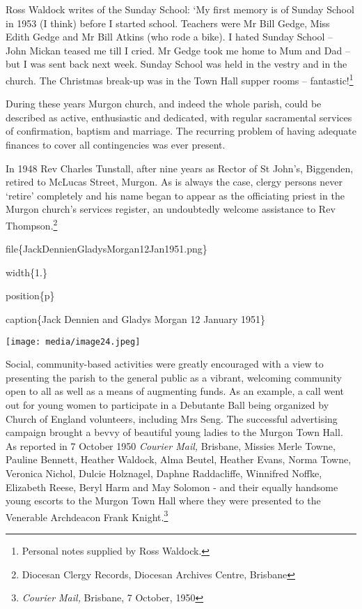 Ross Waldock writes of the Sunday School: `My first memory is of Sunday School in 1953 (I think) before I started school. Teachers were Mr Bill Gedge, Miss Edith Gedge and Mr Bill Atkins (who rode a bike). I hated Sunday School -- John Mickan teased me till I cried. Mr Gedge took me home to Mum and Dad -- but I was sent back next week. Sunday School was held in the vestry and in the church. The Christmas break-up was in the Town Hall supper rooms -- fantastic!\footnote{Personal notes supplied by Ross Waldock.}

During these years Murgon church, and indeed the whole parish, could be described as active, enthusiastic and dedicated, with regular sacramental services of confirmation, baptism and marriage. The recurring problem of having adequate finances to cover all contingencies was ever present.

In 1948 Rev Charles Tunstall, after nine years as Rector of St John's, Biggenden, retired to McLucas Street, Murgon. As is always the case, clergy persons never `retire' completely and his name began to appear as the officiating priest in the Murgon church's services register, an undoubtedly welcome assistance to Rev Thompson.\footnote{Diocesan Clergy Records, Diocesan Archives Centre, Brisbane}

file\{JackDennienGladysMorgan12Jan1951.png\}

width\{1.\}

position\{p\}

caption\{Jack Dennien and Gladys Morgan 12 January 1951\}

\texttt{[image: media/image24.jpeg]}

Social, community-based activities were greatly encouraged with a view to presenting the parish to the general public as a vibrant, welcoming community open to all as well as a means of augmenting funds. As an example, a call went out for young women to participate in a Debutante Ball being organized by Church of England volunteers, including Mrs Seng. The successful advertising campaign brought a bevvy of beautiful young ladies to the Murgon Town Hall. As reported in 7 October 1950 \emph{Courier Mail,} Brisbane, Missies Merle Towne, Pauline Bennett, Heather Waldock, Alma Beutel, Heather Evans, Norma Towne, Veronica Nichol, Dulcie Holznagel, Daphne Raddacliffe, Winnifred Noffke, Elizabeth Reese, Beryl Harm and May Solomon - and their equally handsome young escorts to the Murgon Town Hall where they were presented to the Venerable Archdeacon Frank Knight.\footnote{\emph{Courier Mail,} Brisbane, 7 October, 1950}

